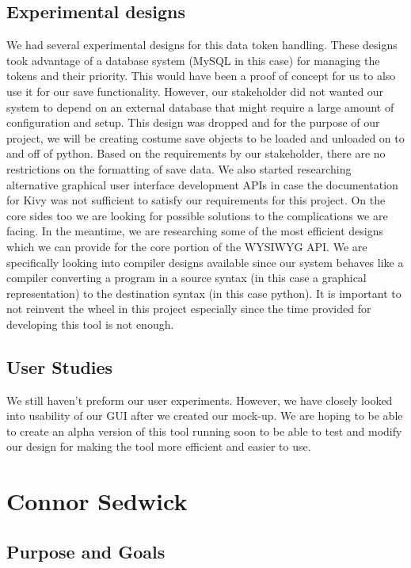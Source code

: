 \documentclass[journal,10pt,onecolumn,compsoc]{IEEEtran} \usepackage[margin=1.0in]{geometry} \usepackage{pdfpages}
\begin{document}
\subsection{Experimental designs}
We had several experimental designs for this data token handling. These designs took advantage of a database system (MySQL in this case) for managing the tokens and their priority. This would have been a proof of concept for us to also use it for our save functionality. However, our stakeholder did not wanted our system to depend on an external database that might require a large amount of configuration and setup. This design was dropped and for the purpose of our project, we will be creating costume save objects to be loaded and unloaded on to and off of python. Based on the requirements by our stakeholder, there are no restrictions on the formatting of save data. We also started researching alternative graphical user interface development APIs in case the documentation for Kivy was not sufficient to satisfy our requirements for this project. On the core sides too we are looking for possible solutions to the complications we are facing. In the meantime, we are researching some of the most efficient designs which we can provide for the core portion of the WYSIWYG API. We are specifically looking into compiler designs available since our system behaves like a compiler converting a program in a source syntax (in this case a graphical representation) to the destination syntax (in this case python). It is important to not reinvent the wheel in this project especially since the time provided for developing this tool is not enough. 
\subsection{User Studies}
We still haven’t preform our user experiments. However, we have closely looked into usability of our GUI after we created our mock-up. We are hoping to be able to create an alpha version of this tool running soon to be able to test and modify our design for making the tool more efficient and easier to use.
\section{Connor Sedwick}
\subsection{Purpose and Goals}
\end{document}
